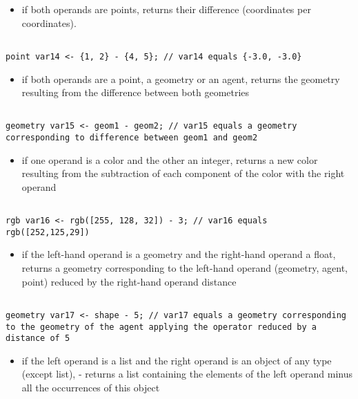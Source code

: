 \documentclass[]{book}
\providecommand{\tightlist}{%
  \setlength{\itemsep}{0pt}\setlength{\parskip}{0pt}}
\theoremstyle{definition}
\theoremstyle{definition}
\theoremstyle{definition}
\theoremstyle{remark}
\begin{document}
\begin{itemize}
\tightlist
\item
  if both operands are points, returns their difference (coordinates per
  coordinates).
\end{itemize}

\begin{verbatim}
 
point var14 <- {1, 2} - {4, 5}; // var14 equals {-3.0, -3.0}
\end{verbatim}

\begin{itemize}
\tightlist
\item
  if both operands are a point, a geometry or an agent, returns the
  geometry resulting from the difference between both geometries
\end{itemize}

\begin{verbatim}
 
geometry var15 <- geom1 - geom2; // var15 equals a geometry corresponding to difference between geom1 and geom2
\end{verbatim}

\begin{itemize}
\tightlist
\item
  if one operand is a color and the other an integer, returns a new
  color resulting from the subtraction of each component of the color
  with the right operand
\end{itemize}

\begin{verbatim}
 
rgb var16 <- rgb([255, 128, 32]) - 3; // var16 equals rgb([252,125,29])
\end{verbatim}

\begin{itemize}
\tightlist
\item
  if the left-hand operand is a geometry and the right-hand operand a
  float, returns a geometry corresponding to the left-hand operand
  (geometry, agent, point) reduced by the right-hand operand distance
\end{itemize}

\begin{verbatim}
 
geometry var17 <- shape - 5; // var17 equals a geometry corresponding to the geometry of the agent applying the operator reduced by a distance of 5
\end{verbatim}

\begin{itemize}
\tightlist
\item
  if the left operand is a list and the right operand is an object of
  any type (except list), - returns a list containing the elements of
  the left operand minus all the occurrences of this object
\end{itemize}
\end{document}
